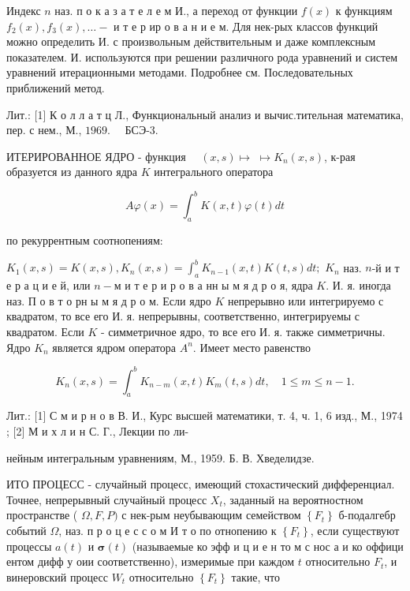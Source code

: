 \documentclass[10pt]{article}
\begin{document}
Индекс $n$ наз. п о к а з а т е л е м И., а переход от функции $f(x)$ к функциям $f_{2}(x), f_{3}(x), \ldots-$ и т е р ир о в а н и е м. Для нек-рых классов функций можно определить И. с произвольным действительным и даже комплексным показателем. И. используются при решении различного рода уравнений и систем уравнений итерационными методами. Подробнее см. Последовательных приближений метод.



Лит.: [1] К о л л а т ц Л., Функциональный анализ и вычис.тительная математика, пер. с нем., М., $1969 . \quad$ БСЭ-3.



ИТЕРИРОВАННОЕ ЯДРО - функция $\quad(x, s) \mapsto$ $\mapsto K_{n}(x, s)$, к-рая образуется из данного ядра $K$ интегрального оператора



\[

A \varphi(x)=\int_{a}^{b} K(x, t) \varphi(t) d t

\]



по рекуррентным соотнопениям:



$K_{1}(x, s)=K(x, s), K_{n}(x, s)=\int_{a}^{b} K_{n-1}(x, t) K(t, s) d t ;$ $K_{n}$ наз. $n$-й и т е р а ц и е й, или $n-м$ и т е р и р о в а нн ы м я д р о я, ядра $K$. И. я. иногда наз. П о в т о рн ы м я д р о м. Если ядро $K$ непрерывно или интегрируемо с квадратом, то все его И. я. непрерывны, соответственно, интегрируемы с квадратом. Если $K$ - симметричное ядро, то все его И. я. также симметричны. Ядро $K_{n}$ является ядром оператора $A^{n}$. Имеет место равенство



\[

K_{n}(x, s)=\int_{a}^{b} K_{n-m}(x, t) K_{m}(t, s) d t, \quad 1 \leqslant m \leqslant n-1 .

\]



Лит.: [1] С м и р н о в В. И., Курс высшей математики, т. 4, ч. 1, 6 изд., М., 1974 ; [2] М и х л и н С. Г., Лекции по ли-

нейным интегральным уравнениям, М., 1959. Б. В. Хведелидзе.



ИТО ПРОЦЕСС - случайный процесс, имеющий стохастический дифференциал. Точнее, непрерывный случайный процесс $X_{t}$, заданный на вероятностном пространстве ( $\Omega, F, P)$ с нек-рым неубывающим семейством $\left\{F_{t}\right\}$ б-подалгебр событий $\Omega$, наз. п р о ц е с с о м И т о по отнопению к $\left\{F_{t}\right\}$, если существуют процессы $a(t)$ и $\boldsymbol{\sigma}(t)$ (называемые ко эфф и ц и е н то м с нос а и ко оффици ентом дифф у оии соответственно), измеримые при каждом $t$ относительно $F_{t}$, и винеровский процесс $W_{t}$ относительно $\left\{F_{t}\right\}$ такие, что
\end{document}
